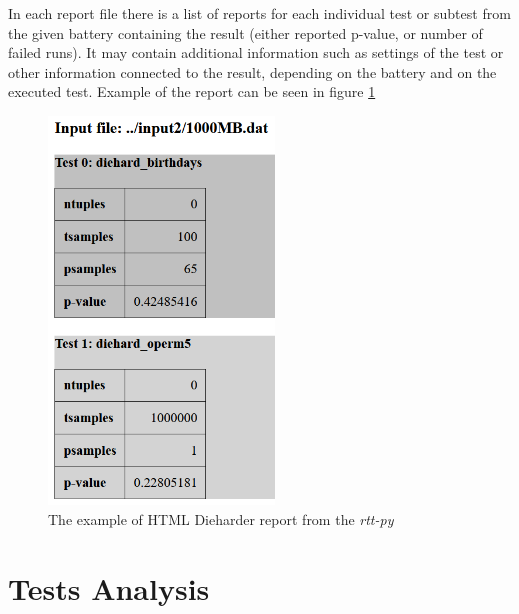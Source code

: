 \documentclass[
  digital,     %
  oneside,     %
  nosansbold,  %
  nocolorbold, %
  nolof,         %
  nolot,         %
]{fithesis4}
\begin{document}
In each report file there is a list of reports for each individual test or subtest from the given battery containing the result (either reported p-value, or number of failed runs). It may contain additional information such as settings of the test or other information connected to the result, depending on the battery and on the executed test. Example of the  report can be seen in figure \ref{fig:rtt_py_html}
\begin{figure}
  \begin{center}
    \includegraphics[width=6cm]{figures/rtt-py-dieharder-html.png}
  \end{center}
  \caption{The example of HTML Dieharder report from the \emph{rtt-py}}
  \label{fig:rtt_py_html}
\end{figure}





\chapter{Tests Analysis} \label{chap: analysis}
\end{document}
